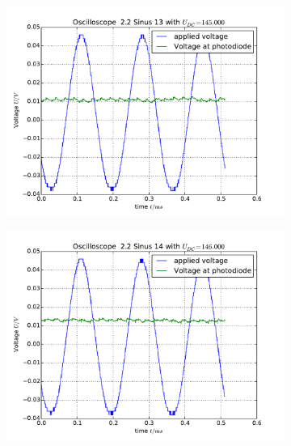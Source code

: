 \begin{figure}
    \begin{subfigure}[b]{\picwidth}
        \includegraphics[width=\textwidth]{analysis/figures/22sinus13}
        \caption{}
    \end{subfigure}\qquad
    \begin{subfigure}[b]{\picwidth}
        \includegraphics[width=\textwidth]{analysis/figures/22sinus14}
        \caption{}
    \end{subfigure}
    \begin{subfigure}[b]{\picwidth}

\end{subfigure}
\end{figure}
